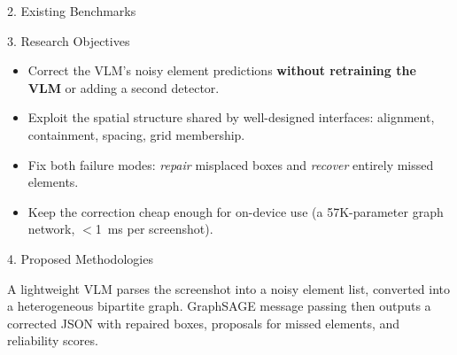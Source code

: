\documentclass[final]{beamer}
\newlength{\colwidth}
\begin{document}
\begin{frame}[t]
\begin{columns}[t]
\begin{column}{\colwidth}
\begin{block}{2. Existing Benchmarks}
  \end{block}

  \begin{block}{3. Research Objectives}

    \begin{itemize}
      \item Correct the VLM's noisy element predictions \textbf{without
        retraining the VLM} or adding a second detector.
      \item Exploit the spatial structure shared by well-designed
        interfaces: alignment, containment, spacing, grid membership.
      \item Fix both failure modes: \emph{repair} misplaced boxes and
        \emph{recover} entirely missed elements.
      \item Keep the correction cheap enough for on-device use
        (a 57K-parameter graph network, $<$1~ms per screenshot).
    \end{itemize}

  \end{block}

  \begin{block}{4. Proposed Methodologies}

    A lightweight VLM parses the screenshot into a noisy element list,
    converted into a heterogeneous bipartite graph. GraphSAGE message
    passing then outputs a corrected JSON with repaired boxes, proposals
    for missed elements, and reliability scores.


\end{block}
\end{column}
\end{columns}
\end{frame}
\end{document}
